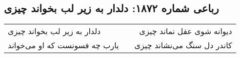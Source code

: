 \begin{center}
\section*{رباعی شماره ۱۸۷۲: دلدار به زیر لب بخواند چیزی}
\label{sec:1872}
\begin{longtable}{l p{0.5cm} r}
دلدار به زیر لب بخواند چیزی
&&
دیوانه شوی عقل نماند چیزی
\\
یارب چه فسونست که او می‌خواند
&&
کاندر دل سنگ می‌نشاند چیزی
\\
\end{longtable}
\end{center}
